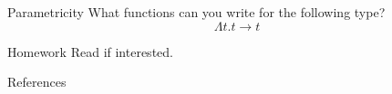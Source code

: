 \begin{frame}{Parametricity}
  What functions can you write for the following type?
  \[
    \Lambda t. t \to t 
  \]

  \begin{block}{Homework}
    Read \cite{Wadler1989} if interested. 
  \end{block}
\end{frame}
%
%
%
%
%
%
%


\begin{frame}{References}

 
\end{frame}


